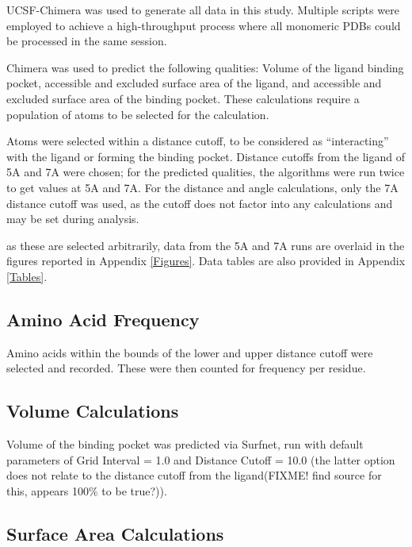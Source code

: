 \documentclass[a4paper, nobind]{templates/ociamthesis}
\begin{document}
UCSF-Chimera was used to generate all data in this study. Multiple scripts were employed to achieve a high-throughput process where all monomeric PDBs could be processed in the same session.

Chimera was used to predict the following qualities: Volume of the ligand binding pocket, accessible and excluded surface area of the ligand, and accessible and excluded surface area of the binding pocket. These calculations require a population of atoms to be selected for the calculation.

Atoms were selected within a distance cutoff, to be considered as ``interacting'' with the ligand or forming the binding pocket. Distance cutoffs from the ligand of 5A and 7A were chosen; for the predicted qualities, the algorithms were run twice to get values at 5A and 7A. For the distance and angle calculations, only the 7A distance cutoff was used, as the cutoff does not factor into any calculations and may be set during analysis.

as these are selected arbitrarily, data from the 5A and 7A runs are overlaid in the figures reported in Appendix \ref{Figures}. Data tables are also provided in Appendix \ref{Tables}.

\hypertarget{amino-acid-frequency}{%
\subsection{Amino Acid Frequency}\label{amino-acid-frequency}}

Amino acids within the bounds of the lower and upper distance cutoff were selected and recorded. These were then counted for frequency per residue.

\hypertarget{volume-calculations}{%
\subsection{Volume Calculations}\label{volume-calculations}}

Volume of the binding pocket was predicted via Surfnet, run with default parameters of Grid Interval = 1.0 and Distance Cutoff = 10.0 (the latter option does not relate to the distance cutoff from the ligand(FIXME! find source for this, appears 100\% to be true?)).

\hypertarget{surface-area-calculations}{%
\subsection{Surface Area Calculations}\label{surface-area-calculations}}
\end{document}
